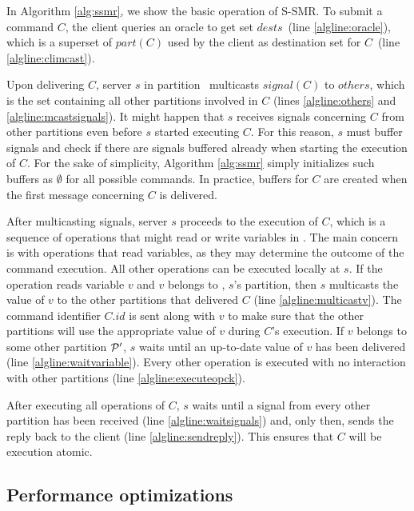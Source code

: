 In Algorithm \ref{alg:ssmr}, we show the basic operation of S-SMR. 
To submit a command $C$, the client queries an oracle to get set $dests$~(line \ref{algline:oracle}), which is a superset of $part(C)$ used by the client as destination set for $C$~(line \ref{algline:climcast}).

Upon delivering $C$, server $s$ in partition \pp\ multicasts $signal(C)$ to $others$, which is the set containing all other partitions involved in $C$ (lines \ref{algline:others} and \ref{algline:mcastsignals}). 
It might happen that $s$ receives signals concerning $C$ from other partitions even before $s$ started executing $C$. For this reason, $s$ must buffer signals and check if there are signals buffered already when starting the execution of $C$. For the sake of simplicity, Algorithm \ref{alg:ssmr} simply initializes such buffers as $\emptyset$ for all possible commands. In practice, buffers for $C$ are created when the first message concerning $C$ is delivered.

After multicasting signals, server $s$ proceeds to the execution of $C$, which is a sequence of operations that might read or write variables in \vv. The main concern is with operations that read variables, as they may determine the outcome of the command execution. All other operations can be executed locally at $s$. If the operation reads variable $v$ and $v$ belongs to \pp, $s$'s partition, then $s$ multicasts the value of $v$ to the other partitions that delivered $C$ (line \ref{algline:multicastv}). The command identifier $C.id$ is sent along with $v$ to make sure that the other partitions will use the appropriate value of $v$ during $C$'s execution. If $v$ belongs to some other partition $\mathcal{P}'$, $s$ waits until an up-to-date value of $v$ has been delivered (line \ref{algline:waitvariable}). Every other operation is executed with no interaction with other partitions (line \ref{algline:executeopck}).

After executing all operations of $C$, $s$ waits until a signal from every other partition has been received (line \ref{algline:waitsignals}) and, only then, sends the reply back to the client (line \ref{algline:sendreply}). This ensures that $C$ will be execution atomic.



\subsection{Performance optimizations}
\label{sec:optm}

